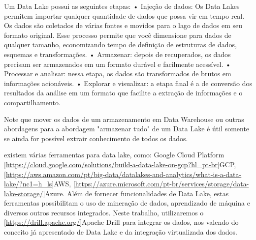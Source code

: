 Um Data Lake possui as seguintes etapas:
• Injeção de dados: Os Data Lakes permitem importar qualquer quantidade de dados que possa vir em tempo real. Os dados são coletados de várias fontes e movidos para o lago de dados em seu formato original. Esse processo permite que você dimensione para dados de qualquer tamanho, economizando tempo de definição de estruturas de dados, esquemas e transformações.
• Armazenar: depois de recuperados, os dados precisam ser armazenados em um formato durável e facilmente acessível.
• Processar e analisar: nessa etapa, os dados são transformados de brutos em informações acionáveis.
• Explorar e visualizar: a etapa final é a de conversão dos resultados da análise em um formato que facilite a extração de informações e o compartilhamento.

Note que mover os dados de um armazenamento em Data Warehouse ou outras abordagens para a abordagem "armazenar tudo" de um  Data Lake é útil somente se ainda for possível extrair conhecimento de todos os dados.

existem várias ferramentas para data lake, como: Google Cloud Platform \ref{https://cloud.google.com/solutions/build-a-data-lake-on-gcp?hl=pt-br}{GCP}, \ref{https://aws.amazon.com/pt/big-data/datalakes-and-analytics/what-is-a-data-lake/?nc1=h_ls}{AWS}, \ref{https://azure.microsoft.com/pt-br/services/storage/data-lake-storage/}{Azure}.  Além de fornecer funcionalidades de Data Lake, estas ferramentas possibilitam o uso de mineração de dados, aprendizado de máquina e diversos outros recursos integrados.
Neste trabalho, utilizaremos o \ref{https://drill.apache.org/}{Apache Drill} para integrar os dados, nos valendo do conceito já apresentado de Data Lake e da integração virtualizada dos dados.

